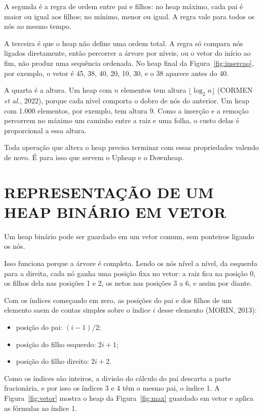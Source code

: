 \documentclass[12pt,openany,oneside,a4paper,english,brazil,sumario=tradicional]{abntex2}
\begin{document}
A segunda é a regra de ordem entre pai e filhos: no heap máximo, cada pai é maior ou igual aos filhos; no mínimo, menor ou igual. A regra vale para todos os nós ao mesmo tempo.

A terceira é que o heap não define uma ordem total. A regra só compara nós ligados diretamente, então percorrer a árvore por níveis, ou o vetor do início ao fim, não produz uma sequência ordenada. No heap final da Figura~\ref{fig:insercao}, por exemplo, o vetor é 45, 38, 40, 20, 10, 30, e o 38 aparece antes do 40.

A quarta é a altura. Um heap com $n$ elementos tem altura $\lfloor \log_2 n \rfloor$ (CORMEN \emph{et al.}, 2022), porque cada nível comporta o dobro de nós do anterior. Um heap com 1.000 elementos, por exemplo, tem altura 9. Como a inserção e a remoção percorrem no máximo um caminho entre a raiz e uma folha, o custo delas é proporcional a essa altura.

Toda operação que altera o heap precisa terminar com essas propriedades valendo de novo. É para isso que servem o Upheap e o Downheap.

\chapter{REPRESENTAÇÃO DE UM HEAP BINÁRIO EM VETOR}

Um heap binário pode ser guardado em um vetor comum, sem ponteiros ligando os nós.

Isso funciona porque a árvore é completa. Lendo os nós nível a nível, da esquerda para a direita, cada nó ganha uma posição fixa no vetor: a raiz fica na posição 0, os filhos dela nas posições 1 e 2, os netos nas posições 3 a 6, e assim por diante.

Com os índices começando em zero, as posições do pai e dos filhos de um elemento saem de contas simples sobre o índice $i$ desse elemento (MORIN, 2013):

\begin{itemize}
  \item posição do pai: $(i - 1) / 2$;
  \item posição do filho esquerdo: $2i + 1$;
  \item posição do filho direito: $2i + 2$.
\end{itemize}

Como os índices são inteiros, a divisão do cálculo do pai descarta a parte fracionária, e por isso os índices 3 e 4 têm o mesmo pai, o índice 1. A Figura~\ref{fig:vetor} mostra o heap da Figura~\ref{fig:max} guardado em vetor e aplica as fórmulas ao índice 1.
\end{document}
